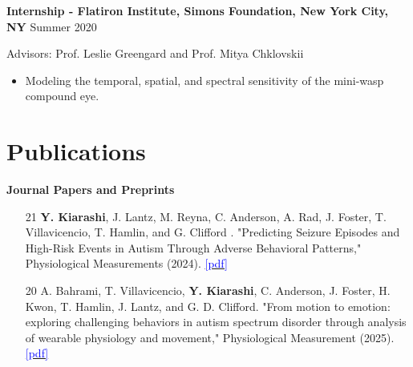 \documentclass[margin, line]{res}
\newenvironment{list1}{
  \begin{list}{\ding{113}}{%
      \setlength{\itemsep}{0in}
      \setlength{\parsep}{0in} \setlength{\parskip}{0in}
      \setlength{\topsep}{0in} \setlength{\partopsep}{0in} 
      \setlength{\leftmargin}{0.17in}}}{\end{list}}
\begin{document}
\begin{resume}
\begin{list1}
\begin{itemize}
		  \end{itemize}


\item[] \textbf{Internship - Flatiron Institute, Simons Foundation, New York City, NY}\hspace*{\fill} Summer 2020
	\item[]Advisors: Prof. Leslie Greengard and Prof. Mitya Chklovskii
			\begin{itemize}
		    \item Modeling the temporal, spatial, and spectral sensitivity of the mini-wasp compound eye. 
		  
		\end{itemize}


			  
		  
  


\end{list1}


\vspace{-0.18cm}

\section{\sc \textbf{\large{Publications}}}
\begin{list1}
\item[] \textbf{Journal Papers and Preprints}
\begin{itemize}
    \item [21]  \textbf{Y. Kiarashi}, J. Lantz, M. Reyna, C. Anderson, A. Rad, J. Foster, T. Villavicencio, T.  Hamlin, and G. Clifford . "Predicting Seizure Episodes and High-Risk Events in Autism Through Adverse Behavioral Patterns," Physiological Measurements (2024). \href{https://iopscience.iop.org/article/10.1088/1361-6579/adcafd/meta}{\textcolor{blue}{[pdf]}}
    \item [20]   A. Bahrami, T. Villavicencio, \textbf{Y. Kiarashi}, C. Anderson, J. Foster, H. Kwon, T. Hamlin, J. Lantz, and G. D. Clifford. "From motion to emotion: exploring challenging behaviors in autism spectrum disorder through analysis of wearable physiology and movement," Physiological Measurement  (2025). \href{https://iopscience.iop.org/article/10.1088/1361-6579/ada51b/meta}{\textcolor{blue}{[pdf]}}
    

\end{itemize}
\end{list1}
\end{resume}
\end{document}
